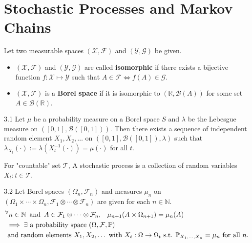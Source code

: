 \documentclass[10pt]{article}
\newenvironment{theorem*}[1]{%
  \IfBlankTF{#1}
    {\renewcommand{\themanualtheoreminner}{\unskip}}
    {\renewcommand\themanualtheoreminner{#1}}%
  \manualtheoreminner
}{\endmanualtheoreminner}
\theoremstyle{definition}
\newenvironment{definition*}[1]{%
  \IfBlankTF{#1}
    {\renewcommand{\themanualdefinitioninner}{\unskip}}
    {\renewcommand\themanualdefinitioninner{#1}}%
  \manualdefinitioninner
}{\endmanualdefinitioninner}
\begin{document}

\section{Stochastic Processes and Markov Chains}

\begin{definition*}{}
    Let two measurable spaces $(\mathcal{X}, \mathcal{F})$ and $(\mathcal{Y}, \mathcal{G})$ be given.
    \leavevmode
    \begin{itemize}
        \item $(\mathcal{X}, \mathcal{F})$ and $(\mathcal{Y}, \mathcal{G})$ are called \textbf{isomorphic} if there exists a bijective function $f : \mathcal{X} \mapsto \mathcal{Y}$ such that $A \in \mathcal{F} \iff f(A) \in \mathcal{G}$.
        \item $(\mathcal{X}, \mathcal{F})$ is a \textbf{Borel space} if it is isomorphic to $(\mathbb{R}, \mathcal{B}(A))$ for some set $A \in \mathcal{B}(\mathbb{R})$.
    \end{itemize}
\end{definition*}

\begin{theorem*}{3.1}
    Let $\mu$ be a probability measure on a Borel space $S$ and $\lambda$ be the Lebesgue measure on $([0,1], \mathcal{B}([0,1]))$.
    Then there exists a sequence of independent random element $X_1, X_2, \ldots$ on $([0,1], \mathcal{B}([0,1]), \lambda)$ such that $\lambda_{X_t}(\cdot) := \lambda(X^{-1}_t(\cdot)) = \mu(\cdot)$ for all $t$.
\end{theorem*}

\begin{definition*}{}
    For "countable" set $\mathcal{T}$, A stochastic process is a collection of random variables ${X_t : t \in \mathcal{T}}$.
\end{definition*}

\begin{theorem*}{3.2}
    Let Borel spaces $(\Omega_n, \mathcal{F}_n)$ and measures $\mu_n$ on $(\Omega_1 \times \cdots \times \Omega_n, \mathcal{F}_1 \otimes \cdots \otimes \mathcal{F}_n)$ are given for each $n \in \mathbb{N}$.
    \begin{align*}
        & ^\forall n \in \mathbb{N} \hspace{0.5em} \text{and} \hspace{0.5em} A \in \mathcal{F}_1 \otimes \cdots \otimes \mathcal{F}_n, \hspace{0.8em} \mu_{n+1}(A\times \Omega_{n+1}) = \mu_n (A) \\
        &\implies \exists \text{ a probability space } (\Omega, \mathcal{F}, \mathbb{P}) \\
        &\text{ and random elements } X_1, X_2, \ldots \text{ with } X_t : \Omega \rightarrow \Omega_t \text{ s.t. } \mathbb{P}_{X_1, \ldots, X_n} = \mu_n \text{ for all } n.
    \end{align*}
\end{theorem*}
\end{document}
